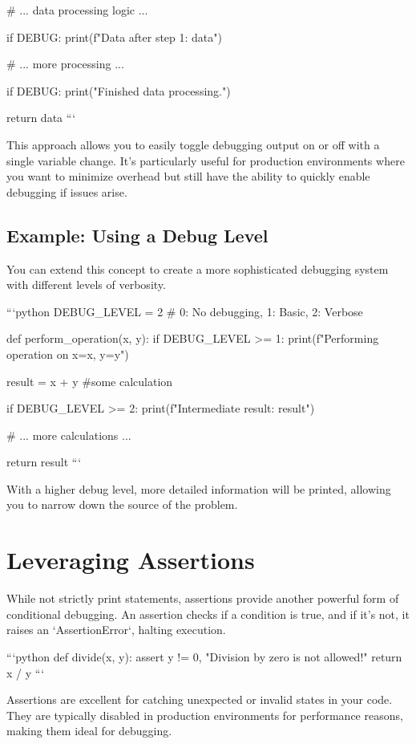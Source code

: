 \documentclass{article}
\begin{document}
  # ... data processing logic ...

  if DEBUG:
    print(f"Data after step 1: {data}")

  # ... more processing ...

  if DEBUG:
    print("Finished data processing.")

  return data
```

This approach allows you to easily toggle debugging output on or off with a single variable change.  It's particularly useful for production environments where you want to minimize overhead but still have the ability to quickly enable debugging if issues arise.

\subsection*{Example: Using a Debug Level}

You can extend this concept to create a more sophisticated debugging system with different levels of verbosity.

```python
DEBUG_LEVEL = 2  # 0: No debugging, 1: Basic, 2: Verbose

def perform_operation(x, y):
  if DEBUG_LEVEL >= 1:
    print(f"Performing operation on x={x}, y={y}")

  result = x + y #some calculation

  if DEBUG_LEVEL >= 2:
    print(f"Intermediate result: {result}")

  # ... more calculations ...

  return result
```

With a higher debug level, more detailed information will be printed, allowing you to narrow down the source of the problem.

\section*{Leveraging Assertions}

While not strictly print statements, assertions provide another powerful form of conditional debugging.  An assertion checks if a condition is true, and if it's not, it raises an `AssertionError`, halting execution.

```python
def divide(x, y):
  assert y != 0, "Division by zero is not allowed!"
  return x / y
```

Assertions are excellent for catching unexpected or invalid states in your code.  They are typically disabled in production environments for performance reasons, making them ideal for debugging.
\end{document}

